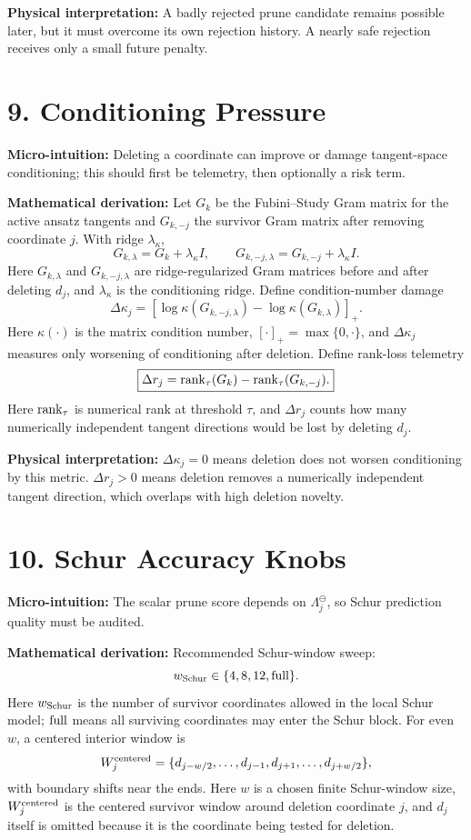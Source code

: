 \documentclass[10pt,twocolumn]{article}
\newcommand{\blk}[1]{\vspace{3pt}\noindent\textbf{#1:}\quad}
\newcommand{\Lam}{\Lambda_j^{\ominus}}
\begin{document}
\blk{Physical interpretation}
A badly rejected prune candidate remains possible later, but it must overcome its own rejection history. A nearly safe rejection receives only a small future penalty.

\section*{9. Conditioning Pressure}

\blk{Micro-intuition}
Deleting a coordinate can improve or damage tangent-space conditioning; this should first be telemetry, then optionally a risk term.

\blk{Mathematical derivation}
Let \(G_k\) be the Fubini--Study Gram matrix for the active ansatz tangents and \(G_{k,-j}\) the survivor Gram matrix after removing coordinate \(j\). With ridge \(\lambda_\kappa\),
\[
G_{k,\lambda}=G_k+\lambda_\kappa I,
\qquad
G_{k,-j,\lambda}=G_{k,-j}+\lambda_\kappa I.
\]
Here \(G_{k,\lambda}\) and \(G_{k,-j,\lambda}\) are ridge-regularized Gram matrices before and after deleting \(d_j\), and \(\lambda_\kappa\) is the conditioning ridge.
Define condition-number damage
\[
\boxed{
\Delta\kappa_j
=
\left[
\log\kappa(G_{k,-j,\lambda})
-
\log\kappa(G_{k,\lambda})
\right]_+.
}
\]
Here \(\kappa(\cdot)\) is the matrix condition number, \([\cdot]_+=\max\{0,\cdot\}\), and \(\Delta\kappa_j\) measures only worsening of conditioning after deletion.
Define rank-loss telemetry
\[
\boxed{
\Delta r_j
=
{\rm rank}_{\tau}(G_k)
-
{\rm rank}_{\tau}(G_{k,-j}).
}
\]
Here \({\rm rank}_{\tau}\) is numerical rank at threshold \(\tau\), and \(\Delta r_j\) counts how many numerically independent tangent directions would be lost by deleting \(d_j\).

\blk{Physical interpretation}
\(\Delta\kappa_j=0\) means deletion does not worsen conditioning by this metric. \(\Delta r_j>0\) means deletion removes a numerically independent tangent direction, which overlaps with high deletion novelty.

\section*{10. Schur Accuracy Knobs}

\blk{Micro-intuition}
The scalar prune score depends on \(\Lam\), so Schur prediction quality must be audited.

\blk{Mathematical derivation}
Recommended Schur-window sweep:
\[
w_{\rm Schur}\in\{4,8,12,{\rm full}\}.
\]
Here \(w_{\rm Schur}\) is the number of survivor coordinates allowed in the local Schur model; \({\rm full}\) means all surviving coordinates may enter the Schur block.
For even \(w\), a centered interior window is
\[
W_j^{\rm centered}
=
\{d_{j-w/2},\ldots,d_{j-1},d_{j+1},\ldots,d_{j+w/2}\},
\]
with boundary shifts near the ends.
Here \(w\) is a chosen finite Schur-window size, \(W_j^{\rm centered}\) is the centered survivor window around deletion coordinate \(j\), and \(d_j\) itself is omitted because it is the coordinate being tested for deletion.
\end{document}
